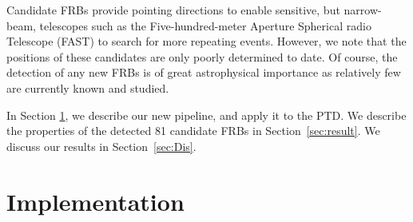 \documentclass[fleqn,usenatbib]{mnras}
\begin{document}
Candidate FRBs provide pointing directions to enable sensitive, but narrow-beam, telescopes such as the Five-hundred-meter Aperture Spherical radio Telescope (FAST) to search for more repeating events. However, we note that the positions of these candidates are only poorly determined to date. Of course, the detection of any new FRBs is of great astrophysical importance as relatively few are currently known and studied. 

%

In Section \ref{sec:data}, we describe our new pipeline, and apply it to the PTD. We describe the properties of the detected 81 candidate FRBs in Section~\ref{sec:result}. We discuss our results in Section~\ref{sec:Dis}. 


\section{Implementation}
\label{sec:data}

\end{document}

